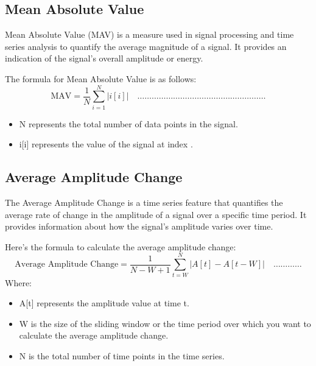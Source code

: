 \subsection{Mean Absolute Value}
Mean Absolute Value (MAV) is a measure used in signal processing and time series analysis to quantify the average magnitude of a signal. It provides an indication of the signal's overall amplitude or energy.
\par
The formula for Mean Absolute Value is as follows:
\begin{equation}
\label{eq: Mean Absolute Value}
\text{MAV} = \frac{1}{N} \sum_{i=1}^{N} |i[i]| \quad  \dots \dots \dots \dots \dots \dots \dots \dots \dots \dots \dots \dots \dots \dots \dots \dots \dots \dots
\end{equation}
\begin{itemize}
    \item N \textrm{ represents the total number of data points in the signal.}
    \item i[i] \textrm{ represents the value of the signal at index }.
\end{itemize}

\subsection{Average Amplitude Change}
The Average Amplitude Change is a time series feature that quantifies the average rate of change in the amplitude of a signal over a specific time period. It provides information about how the signal's amplitude varies over time.
\par
Here's the formula to calculate the average amplitude change:
\begin{equation}
\label{eq: Average Amplitude Change}
\text{Average Amplitude Change} = \frac{1}{N-W+1} \sum_{t=W}^{N} \left| A[t] - A[t-W] \right| \quad  \dots \dots \dots \dots
\end{equation}
Where:
\begin{itemize}
    \item A[t] \textrm{ represents the amplitude value at time } t.
    \item W \textrm{ is the size of the sliding window or the time period over which you want to calculate the average amplitude change.}
    \item N \textrm{ is the total number of time points in the time series.}
\end{itemize}

